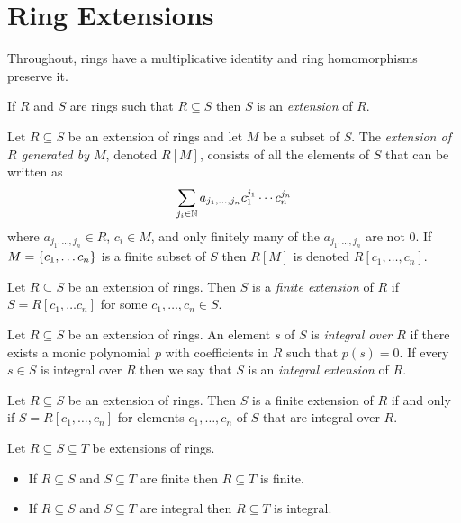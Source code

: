 \documentclass{article}
\title{} \author{} \date{}
\begin{document}
\section{Ring Extensions}

Throughout, rings have a multiplicative identity and ring
homomorphisms preserve it.

\begin{definition}
  If $R$ and $S$ are rings such that $R\subseteq S$ then $S$ is an
  \emph{extension} of $R$.
\end{definition}

\begin{definition}
  Let $R \subseteq S$ be an extension of rings and let $M$ be a subset
  of $S$. The \emph{extension of $R$ generated by $M$}, denoted
  $R[M]$, consists of all the elements of $S$ that can be written as
  \[
  \sum_{j_i \in \mathbb{N}} a_{j_1,\ldots,j_n}c_1^{j_1}\cdots c_n^{j_n}
  \]
  where $a_{j_1, \ldots, j_n}\in R$, $c_i \in M$, and only finitely
  many of the $a_{j_1,\ldots, j_n}$ are not 0. If $M=\{c_1,\ldots
    c_n\}$ is a finite subset of $S$ then $R[M]$ is denoted
  $R[c_1,\ldots, c_n]$.
\end{definition}

\begin{definition}
  Let $R \subseteq S$ be an extension of rings. Then $S$ is a
  \emph{finite extension} of $R$ if $S=R[c_1,\ldots c_n]$ for some
  $c_1, \ldots, c_n\in S$.
\end{definition}

\begin{definition}
  Let $R\subseteq S$ be an extension of rings. An element $s$ of $S$
  is \emph{integral over $R$} if there exists a monic polynomial $p$
  with coefficients in $R$ such that $p(s)=0$. If every $s\in S$ is
  integral over $R$ then we say that $S$ is an \emph{integral
    extension} of $R$.
\end{definition}

\begin{proposition}
  Let $R\subseteq S$ be an extension of rings. Then $S$ is a finite
  extension of $R$ if and only if $S=R[c_1,\ldots, c_n]$ for elements
  $c_1, \ldots, c_n$ of $S$ that are integral over $R$.
\end{proposition}  

\begin{proposition}
  Let $R\subseteq S \subseteq T$ be extensions of rings.
  \begin{itemize}
  \item If $R\subseteq S$ and $S\subseteq T$ are finite then
    $R\subseteq T$ is finite.
  \item If $R\subseteq S$ and $S\subseteq T$ are integral then
    $R\subseteq T$ is integral.
  \end{itemize}
\end{proposition}
\end{document}
